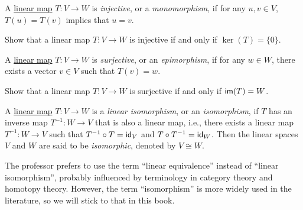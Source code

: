 \begin{definition}\label{def:injective_linear_map}
  A \hyperref[def:linear_map]{linear map} $T \colon V \to W$ is \emph{injective}, or a \emph{monomorphism}, if for any $u, v \in V$, $T(u) = T(v)$ implies that $u = v$.
\end{definition}

\begin{exercise}
  Show that a linear map $T \colon V \to W$ is injective if and only if $\ker(T) = \{ 0 \}$.
\end{exercise}

\begin{definition}\label{def:surjective_linear_map}
  A \hyperref[def:linear_map]{linear map} $T \colon V \to W$ is \emph{surjective}, or an \emph{epimorphism}, if for any $w \in W$, there exists a vector $v \in V$ such that $T(v) = w$.
\end{definition}

\begin{exercise}
  Show that a linear map $T \colon V \to W$ is surjective if and only if $\operatorname{\text{\normalfont\sffamily im}}(T) = W$.
\end{exercise}

\begin{definition}\label{def:linear_isomorphism}
  A \hyperref[def:linear_map]{linear map} $T \colon V \to W$ is a \emph{linear isomorphism}, or an \emph{isomorphism}, if $T$ has an inverse map $T^{-1} \colon W \to V$ that is also a linear map, i.e., there exists a linear map $T^{-1} \colon W \to V$ such that $T^{-1} \circ T = \operatorname{\text{\normalfont\sffamily id}}_V$ and $T \circ T^{-1} = \operatorname{\text{\normalfont\sffamily id}}_W$. Then the linear spaces $V$ and $W$ are said to be \emph{isomorphic}, denoted by $V \cong W$.
\end{definition}
\begin{remark}
  The professor prefers to use the term ``linear equivalence'' instead of ``linear isomorphism'', probably influenced by terminology in category theory and homotopy theory. However, the term ``isomorphism'' is more widely used in the literature, so we will stick to that in this book.
\end{remark}

